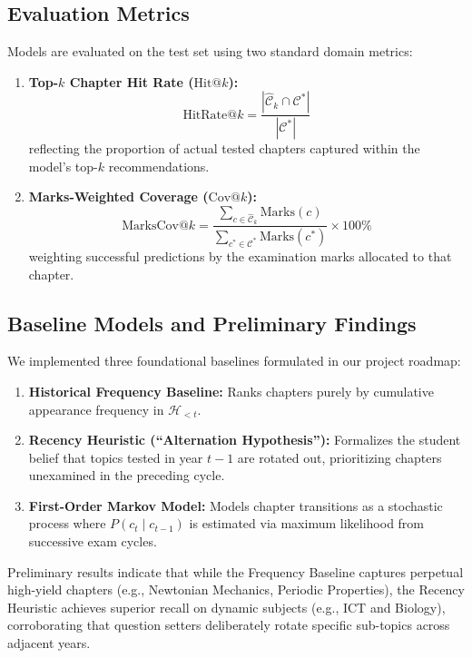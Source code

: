 \documentclass[11pt,a4paper]{article}
\begin{document}
\subsection{Evaluation Metrics}
Models are evaluated on the test set using two standard domain metrics:
\begin{enumerate}
    \item \textbf{Top-$k$ Chapter Hit Rate ($\text{Hit}@k$):}
    \begin{equation}
        \text{HitRate}@k = \frac{|\hat{\mathcal{C}}_k \cap \mathcal{C}^*|}{|\mathcal{C}^*|}
    \end{equation}
    reflecting the proportion of actual tested chapters captured within the model's top-$k$ recommendations.
    \item \textbf{Marks-Weighted Coverage ($\text{Cov}@k$):}
    \begin{equation}
        \text{MarksCov}@k = \frac{\sum_{c \in \hat{\mathcal{C}}_k} \text{Marks}(c)}{\sum_{c^* \in \mathcal{C}^*} \text{Marks}(c^*)} \times 100\%
    \end{equation}
    weighting successful predictions by the examination marks allocated to that chapter.
\end{enumerate}

\subsection{Baseline Models and Preliminary Findings}
We implemented three foundational baselines formulated in our project roadmap:
\begin{enumerate}[noitemsep,topsep=2pt]
    \item \textbf{Historical Frequency Baseline:} Ranks chapters purely by cumulative appearance frequency in $\mathcal{H}_{<t}$.
    \item \textbf{Recency Heuristic (``Alternation Hypothesis''):} Formalizes the student belief that topics tested in year $t-1$ are rotated out, prioritizing chapters unexamined in the preceding cycle.
    \item \textbf{First-Order Markov Model:} Models chapter transitions as a stochastic process where $P(c_t \mid c_{t-1})$ is estimated via maximum likelihood from successive exam cycles.
\end{enumerate}

Preliminary results indicate that while the Frequency Baseline captures perpetual high-yield chapters (e.g., Newtonian Mechanics, Periodic Properties), the Recency Heuristic achieves superior recall on dynamic subjects (e.g., ICT and Biology), corroborating that question setters deliberately rotate specific sub-topics across adjacent years.
\end{document}

